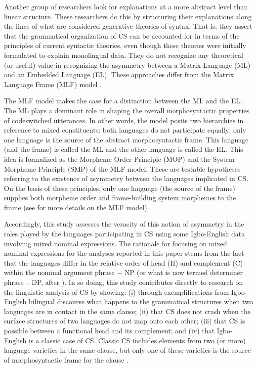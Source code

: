 \documentclass[output=paper]{langsci/langscibook}
\begin{document}
Another group of researchers look for explanations at a more abstract level than linear structure. These researchers \citep{BelaziEtAl1994,DiSciulloEtAl1986,MacSwan2009} do this by structuring their explanations along the lines of what are considered generative theories of syntax. That is, they assert that the grammatical organization of CS can be accounted for in terms of the principles of current syntactic theories, even though these theories were initially formulated to explain monolingual data. They do not recognize any theoretical (or useful) value in recognizing the asymmetry between a Matrix Language (ML) and an Embedded Language (EL). These approaches differ from the Matrix Language Frame (MLF) model \citep{MyersScotton1993,MyersScotton2002,MyersScotton2013}.

The MLF model makes the case for a distinction between the ML and the EL. The ML plays a dominant role in shaping the overall morphosyntactic properties of codeswitched utterances. In other words, the model posits two hierarchies in reference to mixed constituents: both languages do not participate equally; only one language is the source of the abstract morphosyntactic frame. This language (and the frame) is called the ML and the other language is called the EL. This idea is formalized as the Morpheme Order Principle (MOP) and the System Morpheme Principle (SMP) of the MLF model. These are testable hypotheses referring to the existence of asymmetry between the languages implicated in CS. On the basis of these principles, only one language (the source of the frame) supplies both morpheme order and frame-building system morphemes to the frame (see  for more details on the MLF model). 

Accordingly, this study assesses the veracity of this notion of asymmetry in the roles played by the languages participating in CS using some Igbo-English data involving mixed nominal expressions. The rationale for focusing on mixed nominal expressions for the analyses reported in this paper stems from the fact that the languages differ in the relative order of head (H) and complement (C) within the nominal argument phrase $-$ NP (or what is now termed determiner phrase – DP, after \citealt{Abney1987}). In so doing, this study contributes directly to research on the linguistic analysis of CS by showing: (i) through exemplifications from Igbo-English bilingual discourse what happens to the grammatical structures when two languages are in contact in the same clause; (ii) that CS does not crash when the surface structures of two languages do not map onto each other; (iii) that CS is possible between a functional head and its complement; and (iv) that Igbo-English is a classic case of CS. Classic CS includes elements from two (or more) language varieties in the same clause, but only one of these varieties is the source of morphosyntactic frame for the clause \citep[8]{MyersScotton2002}.
\end{document}
